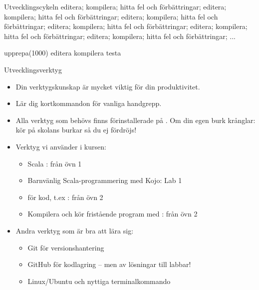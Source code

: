 \begin{Slide}{Utvecklingscykeln}
editera; kompilera; hitta fel och förbättringar; editera; kompilera; hitta fel och förbättringar; editera; kompilera; hitta fel och förbättringar; editera; kompilera; hitta fel och förbättringar; editera; kompilera; hitta fel och förbättringar; editera; kompilera; hitta fel och förbättringar; ...

\begin{Code}
upprepa(1000){
  editera
  kompilera
  testa
}
\end{Code}
\end{Slide}

\begin{Slide}{Utvecklingsverktyg}
\begin{itemize}\SlideFontSmall
\item Din verktygskunskap är mycket viktig för din produktivitet.
\item Lär dig kortkommandon för vanliga handgrepp.
\item Alla verktyg som behövs finns förinstallerade på . Om din egen burk krånglar: kör på skolans burkar så du ej fördröjs!

\item Verktyg vi använder i kursen:
\begin{itemize}\SlideFontTiny
\item Scala : från övn 1
\item Barnvänlig Scala-programmering med Kojo: Lab 1
\item {} för kod, t.ex : från övn 2
\item Kompilera och kör fristående program med : från övn 2
\end{itemize}
\item Andra verktyg som är bra att lära sig: 
\begin{itemize}\SlideFontTiny
\item Git för versionshantering
\item GitHub för kodlagring -- men  av lösningar till labbar!
\item Linux/Ubuntu och nyttiga terminalkommando
\end{itemize}
\end{itemize}
\end{Slide}

